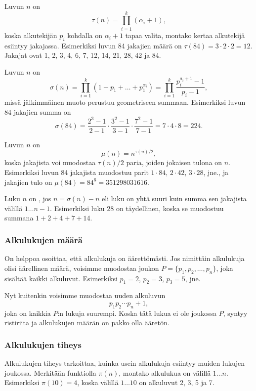 Luvun $n$  on
\[\tau(n)=\prod_{i=1}^k (\alpha_i+1),\]
koska alkutekijän $p_i$ kohdalla on $\alpha_i+1$
tapaa valita, montako kertaa alkutekijä
esiintyy jakajassa.
Esimerkiksi luvun 84 jakajien määrä
on $\tau(84)=3 \cdot 2 \cdot 2 = 12$.
Jakajat ovat
1, 2, 3, 4, 6, 7, 12, 14, 21, 28, 42 ja 84.

Luvun $n$  on
\[\sigma(n)=\prod_{i=1}^k (1+p_1+\ldots+p_1^{\alpha_i}) = \prod_{i=1}^k \frac{p_i^{a_i+1}-1}{p_i-1},\]
missä jälkimmäinen muoto perustuu geometriseen summaan.
Esimerkiksi luvun 84 jakajien summa on
\[\sigma(84)=\frac{2^3-1}{2-1} \cdot \frac{3^2-1}{3-1} \cdot \frac{7^2-1}{7-1} = 7 \cdot 4 \cdot 8 = 224.\]

Luvun $n$  on
\[\mu(n)=n^{\tau(n)/2},\]
koska jakajista voi muodostaa
$\tau(n)/2$ paria, joiden jokaisen tulona on $n$.
Esimerkiksi luvun 84 jakajista muodostuu parit
$1 \cdot 84$, $2 \cdot 42$, $3 \cdot 28$, jne.,
ja jakajien tulo on $\mu(84)=84^6=351298031616$.


Luku $n$ on , jos $n=\sigma(n)-n$
eli luku on yhtä suuri kuin summa sen jakajista
välillä $1 \ldots n-1$.
Esimerkiksi luku 28 on täydellinen, koska
se muodostuu summana $1+2+4+7+14$.

\subsubsection{Alkulukujen määrä}

On helppoa osoittaa, että alkulukuja on äärettömästi.
Jos nimittäin alkulukuja olisi äärellinen määrä,
voisimme muodostaa joukon $P=\{p_1,p_2,\ldots,p_n\}$,
joka sisältää kaikki alkuluvut.
Esimerkiksi $p_1=2$, $p_2=3$, $p_3=5$, jne.

Nyt kuitenkin voisimme muodostaa uuden alkuluvun
\[p_1 p_2 \cdots p_n+1,\]
joka on kaikkia $P$:n lukuja suurempi.
Koska tätä lukua ei ole joukossa $P$,
syntyy ristiriita ja alkulukujen määrän on
pakko olla ääretön.

\subsubsection{Alkulukujen tiheys}

Alkulukujen tiheys tarkoittaa, kuinka usein alkulukuja
esiintyy muiden lukujen joukossa.
Merkitään funktiolla $\pi(n)$, 
montako alkulukua on välillä $1 \ldots n$.
Esimerkiksi $\pi(10)=4$, koska välillä $1 \ldots 10$
on alkuluvut 2, 3, 5 ja 7.

